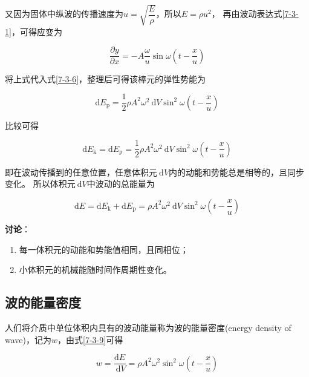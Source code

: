 \documentclass[12pt, a4paper]{article}
\numberwithin{equation}{section}
\newcommand{\rmd}{\mathrm{~d}}
\begin{document}
    又因为固体中纵波的传播速度为\(u = \sqrt{\dfrac{E }{\rho}}\)，所以\(E = \rho u^2\)，
    再由波动表达式\ref{7-3-1}，可得应变为

    \begin{equation}
        \frac{\partial y}{\partial x}=-A \frac{\omega}{u} \sin \omega\left(t-\frac{x}{u}\right)
    \end{equation}

    将上式代入式\ref{7-3-6}，整理后可得该棒元的弹性势能为

    \begin{equation}
        \mathrm{d} E_{\mathrm{p}}=\frac{1}{2} \rho A^2 \omega^2 \mathrm{~d} V \sin ^2 \omega\left(t-\frac{x}{u}\right)
    \end{equation}

    比较可得

    $$
        \mathrm{d} E_{\mathrm{k}}=\mathrm{d} E_{\mathrm{p}}=
        \frac{1}{2} \rho A^2 \omega^2 \mathrm{~d} V \sin ^2 \omega\left(t-\frac{x}{u}\right)
    $$

    即在波动传播到的任意位置，任意体积元\(\rmd V\)内的动能和势能总是相等的，且同步变化。
    所以体积元\(\rmd V\)中波动的总能量为

    \begin{equation}
        \mathrm{d} E=\mathrm{d} E_{\mathrm{k}}+\mathrm{d} E_{\mathrm{p}}=\rho A^2 \omega^2 \mathrm{~d} V \sin ^2 \omega\left(t-\frac{x}{u}\right)
        \label{7-3-9}
    \end{equation}

    \textbf{讨论}：

    \begin{enumerate}
        \item 每一体积元的动能和势能值相同，且同相位；
        \item 小体积元的机械能随时间作周期性变化。
    \end{enumerate}

\subsection{波的能量密度}

    人们将介质中单位体积内具有的波动能量称为波的能量密度(energy density of wave)，记为$w$，由式\ref{7-3-9}可得

    \begin{equation}
        w=\frac{\mathrm{d} E}{\mathrm{~d} V}=\rho A^2 \omega^2 \sin ^2 \omega\left(t-\frac{x}{u}\right)
    \end{equation}
\end{document}
